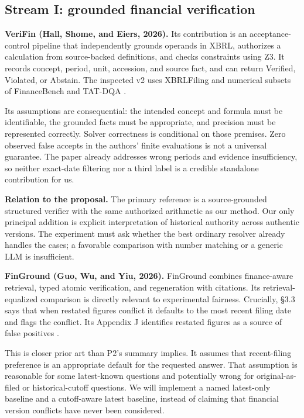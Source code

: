 \documentclass[11pt,a4paper]{article}
\newcommand{\pbreak}{\clearpage}
\newcommand{\lead}[1]{\textbf{\color{navy}#1}}
\begin{document}
\pbreak
\subsection{Stream I: grounded financial verification}
\lead{VeriFin (Hall, Shome, and Eiers, 2026).} Its contribution is an acceptance-control pipeline that independently grounds operands in XBRL, authorizes a calculation from source-backed definitions, and checks constraints using Z3. It records concept, period, unit, accession, and source fact, and can return Verified, Violated, or Abstain. The inspected v2 uses XBRLFiling and numerical subsets of FinanceBench and TAT-DQA \cite{verifin}.

Its assumptions are consequential: the intended concept and formula must be identifiable, the grounded facts must be appropriate, and precision must be represented correctly. Solver correctness is conditional on those premises. Zero observed false accepts in the authors' finite evaluations is not a universal guarantee. The paper already addresses wrong periods and evidence insufficiency, so neither exact-date filtering nor a third label is a credible standalone contribution for us.

\lead{Relation to the proposal.} The primary reference is a source-grounded structured verifier with the same authorized arithmetic as our method. Our only principal addition is explicit interpretation of historical authority across authentic versions. The experiment must ask whether the best ordinary resolver already handles the cases; a favorable comparison with number matching or a generic LLM is insufficient.

\lead{FinGround (Guo, Wu, and Yiu, 2026).} FinGround combines finance-aware retrieval, typed atomic verification, and regeneration with citations. Its retrieval-equalized comparison is directly relevant to experimental fairness. Crucially, §3.3 says that when restated figures conflict it defaults to the most recent filing date and flags the conflict. Its Appendix J identifies restated figures as a source of false positives \cite{finground}.

This is closer prior art than P2's summary implies. It assumes that recent-filing preference is an appropriate default for the requested answer. That assumption is reasonable for some latest-known questions and potentially wrong for original-as-filed or historical-cutoff questions. We will implement a named latest-only baseline and a cutoff-aware latest baseline, instead of claiming that financial version conflicts have never been considered.
\end{document}
